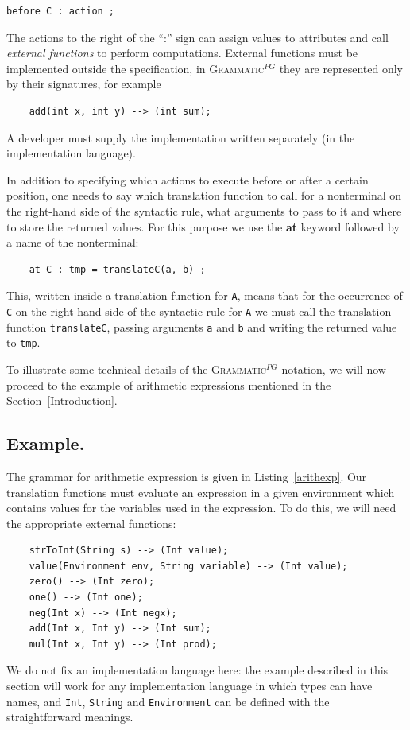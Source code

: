 \documentclass{informat} %
\newcommand{\lstref}[1]{Listing~\ref{#1}}
\newcommand{\secref}[1]{Section~\ref{#1}}
\newcommand{\ATF}{\textsc{Grammatic}$^{PG}$}
\begin{document}
\begin{lstlisting}[emph={action},emphstyle={\it}]
	before C : action ;
\end{lstlisting}

The actions to the right of the ``:'' sign can assign values to attributes and call \emph{external functions} to perform computations. External functions must be implemented outside the specification, in \ATF{} they are represented only by their signatures, for example
\begin{lstlisting}
	add(int x, int y) --> (int sum);
\end{lstlisting}
A developer must supply the implementation written separately (in the implementation language).

In addition to specifying which actions to execute before or after a certain position, one needs to say which translation function to call for a nonterminal on the right-hand side of the syntactic rule, what arguments to pass to it and where to store the returned values. For this purpose we use the \textbf{at} keyword followed by a name of the nonterminal:
\begin{lstlisting}
	at C : tmp = translateC(a, b) ;
\end{lstlisting}
This, written inside a translation function for \texttt{A}, means that for the occurrence of \texttt{C} on the right-hand side of the syntactic rule for \texttt{A} we must call the translation function \texttt{translateC}, passing arguments \texttt{a} and \texttt{b} and writing the returned value to \texttt{tmp}.

To illustrate some technical details of the \ATF{} notation, we will now proceed to the example of arithmetic expressions mentioned in the \secref{Introduction}.

\subsection{Example.}

The grammar for arithmetic expression is given in \lstref{arithexp}. Our translation functions must evaluate an expression in a given environment which contains values for the variables used in the expression. To do this, we will need the appropriate external functions:
\begin{lstlisting}
	strToInt(String s) --> (Int value);
	value(Environment env, String variable) --> (Int value);
	zero() --> (Int zero);
	one() --> (Int one);
	neg(Int x) --> (Int negx);
	add(Int x, Int y) --> (Int sum);
	mul(Int x, Int y) --> (Int prod);
\end{lstlisting}
We do not fix an implementation language here: the example described in this section will work for any implementation language in which types can have names, and \texttt{Int}, \texttt{String} and \texttt{Environment} can be defined with the straightforward meanings.
\end{document}

